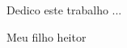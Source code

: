 
\begin{flushright}
\begin{minipage}{0.5\textwidth}

\vspace{15.0cm} %

Dedico este trabalho ...


Meu filho heitor


\end{minipage}
\end{flushright}